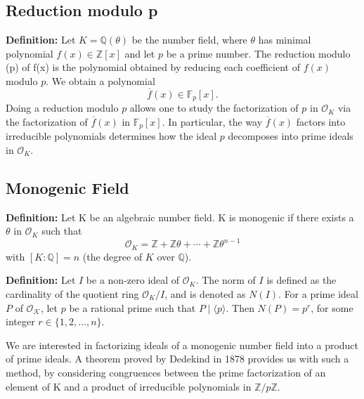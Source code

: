 \subsection{Reduction modulo p}
\begin{flushleft}
    \quad\textbf{Definition:} Let $K = \mathbb{Q}(\theta)$ be the number field, where $\theta$ has minimal polynomial $f(x) \in \mathbb{Z}[x]$ and let $p$ be a prime number. The reduction modulo (p) of f(x) is the polynomial obtained by reducing each coefficient of $f(x)$ modulo $p$. We obtain a polynomial
    \[
    \overline{f}(x) \in \mathbb{F}_p[x].
    \]
    Doing a reduction modulo $p$ allows one to study the factorization of $p$ in $\mathcal{O}_K$ via the factorization of $\overline{f}(x)$ in $\mathbb{F}_p[x]$. In particular, the way $\overline{f}(x)$ factors into irreducible polynomials determines how the ideal $p$ decomposes into prime ideals in $\mathcal{O}_K$.
\end{flushleft}

\subsection{Monogenic Field}
\begin{flushleft}
    \quad\textbf{Definition:} Let K be an algebraic number field. K is monogenic if there exists a $\theta$ 
    in $\mathcal{O}_K$ such that 
    \[
    \mathcal{O}_K = \mathbb{Z} + \mathbb{Z}\theta + \cdots + \mathbb{Z}\theta^{n-1}
    \]
    with $[K:\mathbb{Q}] = n$ (the degree of $K$ over $\mathbb{Q}$).
\end{flushleft}

\begin{flushleft}
    \quad\textbf{Definition:} Let $I$ be a non-zero ideal of  $\mathcal{O}_K$. The norm of $I$ is defined as the cardinality of the quotient ring $\mathcal{O}_K/I$, and is denoted as $N(I)$. 
    For a prime ideal $P$ of $\mathcal{O_K}$, let $p$ be a rational prime such that $P \mid \langle p \rangle$. Then $N(P) = p^r$, for some integer $r \in \{1,2,\dots,n\}$. 
\end{flushleft}


\bigskip

We are interested in factorizing ideals of a monogenic number field into a product of 
prime ideals. A theorem proved by Dedekind in 1878 provides us with such a method, by considering congruences between the prime factorization of 
an element of K and a product of irreducible polynomials in $\mathbb{Z}/p\mathbb{Z}$.

